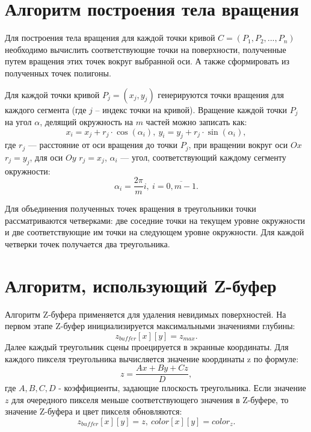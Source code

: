 \section{Алгоритм построения тела вращения}
Для построения тела вращения для каждой точки кривой $C = (P_1, P_2,...,P_n)$ необходимо вычислить соответствующие точки на поверхности, полученные путем вращения этих точек вокруг выбранной оси. А также сформировать из полученных точек полигоны.

Для каждой точки кривой $P_j = (x_j, y_j)$ генерируются точки вращения для каждого сегмента (где $j$ -- индекс точки на кривой). Вращение каждой точки $P_j$ на угол $\alpha$, делящий окружность на $m$ частей можно записать как:
\begin{equation}
    x_i = x_j + r_j \cdot \cos(\alpha_i), \ y_i = y_j + r_j \cdot \sin(\alpha_i),
\end{equation}
где $r_j$ --- расстояние от оси вращения до точки $P_j$, при вращении вокруг оси $Ox$ $r_j = y_j$, для оси $Oy$ $r_j = x_j$, $\alpha_i$ --- угол, соответствующий каждому сегменту окружности:
\begin{equation}
    \alpha_i = \frac{2\pi}{m} i,\ i = \overline{0, m-1}.
\end{equation}

Для объединения полученных точек вращения в треугольники точки рассматриваются четверками: две соседние точки на текущем уровне окружности и две соответствующие им точки на следующем уровне окружности. Для каждой четверки точек получается два треугольника.

\section{Алгоритм, использующий Z-буфер}
Алгоритм Z-буфера применяется для удаления невидимых поверхностей. На первом этапе Z-буфер инициализируется максимальными значениями глубины:
\begin{equation}
    z_{buffer}[x][y] = z_{max}.
\end{equation}
Далее каждый треугольник сцены проецируется в экранные координаты. Для каждого пикселя треугольника вычисляется значение координаты z по формуле:
\begin{equation}
    z = \frac{Ax + By + Cz}{D},
\end{equation}
где $A, B, C, D$ - коэффициенты, задающие плоскость треугольника. Если значение $z$ для очередного пикселя меньше соответствующего значения в Z-буфере, то значение Z-буфера и цвет пикселя обновляются:
\begin{equation}
    z_{buffer}[x][y] = z,\ 
    color[x][y] = color_z.
\end{equation}

